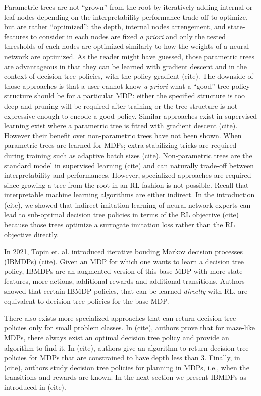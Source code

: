 Parametric trees are not ``grown'' from the root by iteratively adding internal or leaf nodes depending on the interpretability-performance trade-off to optimize, but are rather ``optimized'': the depth, internal nodes arrengement, and state-features to consider in each nodes are fixed \textit{a priori} and only the tested thresholds of each nodes are optimized similarly to how the weights of a neural network are optimized.
As the reader might have guessed, those parametric trees are advantageous in that they can be learned with gradient descent and in the context of decision tree policies, with the policy gradient (cite).
The downside of those approaches is that a user cannot know \textit{a priori}  what a ``good'' tree policy structure should be for a particular MDP: either the specified structure is too deep and pruning will be required after training or the tree structure is not expressive enough to encode a good policy. 
Similar approaches exist in supervised learning exist where a parametric tree is fitted with gradient descent (cite). However their benefit over non-parametric trees have not been shown.
When parametric trees are learned for MDPs; extra stabilizing tricks are required during training such as adaptive batch sizes (cite).
Non-parametric trees are the standard model in supervised learning (cite) and can naturally trade-off between interpretability and performances. 
However, specialized approaches are required since growing a tree from the root in an RL fashion is not possible.
Recall that interpretable machine learning algorithms are either indirect.
In the introduction (cite), we showed that indirect imitation learning of neural network experts can lead to sub-optimal decision tree policies in terms of the RL objective (cite) because those trees optimize a surrogate imitation loss rather than the RL objective directly.

In 2021, Topin et. al. introduced iterative bouding Markov decision processes (IBMDPs) (cite). 
Given an MDP for which one wants to learn a decision tree policy, IBMDPs are an augmented version of this base MDP with more state features, more actions, additional rewards and additional transitions.
Authors showed that certain IBMDP policies, that can be learned \textit{directly} with RL, are equivalent to decision tree policies for the base MDP.

There also exists more specialized approaches that can return decision tree policies only for small problem classes.
In (cite), authors prove that for maze-like MDPs, there always exist an optimal decision tree policy and provide an algorithm to find it. 
In (cite), authors give an algorithm to return decision tree policies for MDPs that are constrained to have depth less than 3. 
Finally, in (cite), authors study decision tree policies for planning in MDPs, i.e., when the transitions and rewards are known.
In the next section we present IBMDPs as introduced in (cite).

